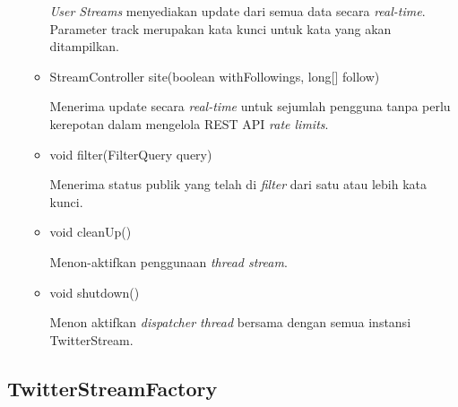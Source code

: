 \begin{itemize}
\begin{itemize}
			\textit{User Streams} menyediakan update dari semua data secara \textit{real-time}. Parameter track merupakan kata kunci untuk kata yang akan ditampilkan.
			\item StreamController site(boolean withFollowings, long[] follow)
			
			Menerima update secara \textit{real-time} untuk sejumlah pengguna tanpa perlu kerepotan dalam mengelola REST API \textit{rate limits}.
			\item void filter(FilterQuery query)
			
			Menerima status publik yang telah di \textit{filter} dari satu atau lebih kata kunci.
			\item void cleanUp()
			
			Menon-aktifkan penggunaan \textit{thread stream}.
			\item void shutdown()
			
			Menon aktifkan \textit{dispatcher thread} bersama dengan semua instansi TwitterStream.
		\end{itemize}
	\end{itemize}
	
	\subsection{TwitterStreamFactory}
	
